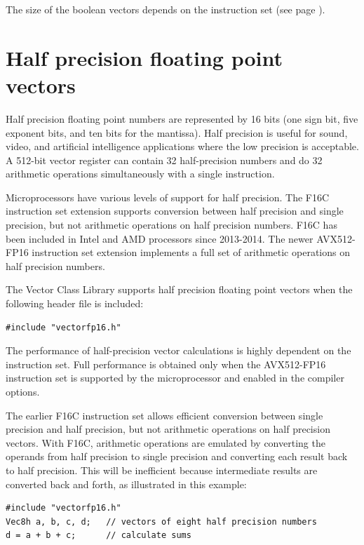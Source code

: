 \documentclass[vcl_manual.tex]{subfiles}
\begin{document}
The size of the boolean vectors depends on the instruction set (see page \pageref{tableBooleanVectorSizes}).


\section{Half precision floating point vectors} \label{HalfPrecision}
Half precision floating point numbers are represented by 16 bits (one sign bit, five exponent bits, and ten bits for the mantissa). Half precision is useful for sound, video, and artificial intelligence applications where the low precision is acceptable. A 512-bit vector register can contain 32 half-precision numbers and do 32 arithmetic operations simultaneously with a single instruction. 

Microprocessors have various levels of support for half precision. The F16C instruction set extension supports conversion between half precision and single precision, but not arithmetic operations on half precision numbers. F16C has been included in Intel and AMD processors since 2013-2014. The newer AVX512-FP16 instruction set extension implements a full set of arithmetic operations on half precision numbers.

The Vector Class Library supports half precision floating point vectors when the following header file is included:
\begin{lstlisting}[frame=single]
#include "vectorfp16.h"
\end{lstlisting}

The performance of half-precision vector calculations is highly dependent on the instruction set. Full performance is obtained only when the AVX512-FP16 instruction set is supported by the microprocessor and enabled in the compiler options.

The earlier F16C instruction set allows efficient conversion between single precision and half precision, but not arithmetic operations on half precision vectors. With F16C, arithmetic operations are emulated by converting the operands from half precision to single precision and converting each result back to half precision. This will be inefficient because intermediate results are converted back and forth, as illustrated in this example:

\begin{lstlisting}[frame=single]
#include "vectorfp16.h"
Vec8h a, b, c, d;   // vectors of eight half precision numbers
d = a + b + c;      // calculate sums
\end{lstlisting}
\end{document}
